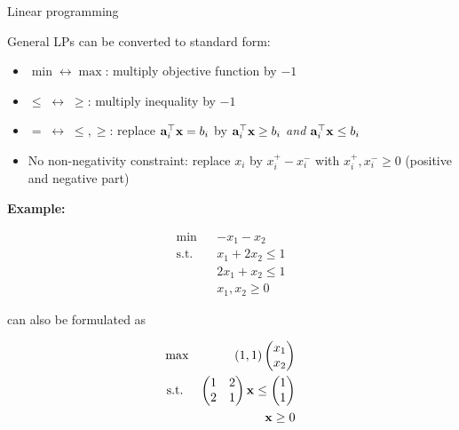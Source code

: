 \documentclass[11pt,compress,t,notes=noshow, xcolor=table]{beamer}
\begin{document}
\begin{vbframe}{Linear programming}
\framebreak

General LPs can be converted to standard form:

\begin{itemize}
    \setlength{\itemsep}{1em}
    \item $\min \longleftrightarrow \max$: multiply objective function by $-1$
    \item $\leq \; \longleftrightarrow \; \geq$: multiply inequality by $-1$
    \item $= \; \longleftrightarrow \; \leq,\geq$: replace $\mathbf{a}_i^\top\mathbf{x}=b_i$ by $\mathbf{a}_i^\top\mathbf{x}\ge b_i$ \textit{and} $\mathbf{a}_i^\top\mathbf{x}\le b_i$
    \item No non-negativity constraint: replace $x_i$ by $x_i^+ - x_i^-$ with $x_i^+, x_i^- \ge 0$ (positive and negative part)
\end{itemize}


\framebreak

\textbf{Example:}

\vspace{-\baselineskip}

\begin{eqnarray*}
\min && - x_1 - x_2 \\
\text{s.t. } && x_1 + 2x_2 \le 1\\
&& 2x_1 + x_2 \le 1 \\
&& x_1, x_2 \ge 0
\end{eqnarray*}

can also be formulated as

\vspace*{-\baselineskip}

\begin{eqnarray*}
\max && (1, 1) \begin{pmatrix} x_1 \\ x_2 \end{pmatrix} \\
\text{s.t. } &&  \begin{pmatrix}  1 &  2 \\  2 &  1 \end{pmatrix} \mathbf{x} \le \begin{pmatrix}  1 \\  1
\end{pmatrix} \\
&& \mathbf{x} \ge 0
\end{eqnarray*}

\end{vbframe}
\end{document}
